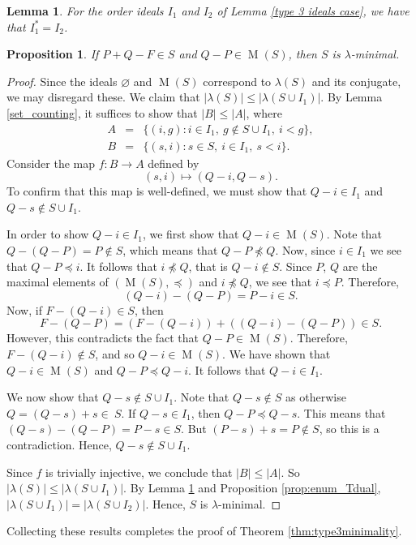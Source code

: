 \documentclass{amsproc}
\DeclareMathOperator{\M}{M}
\newtheorem{lemma}[theorem]{Lemma}
\newtheorem{prop}[theorem]{Proposition}
\theoremstyle{definition}
\theoremstyle{remark}
\numberwithin{equation}{section}
\begin{document}
\begin{lemma}\cite[Section 6]{chen2023enumeratingnumericalsetsassociated}
    \label{type 3 ideals duals}
    For the order ideals $I_1$ and $I_2$ of Lemma \ref{type 3 ideals case}, we have that $I_1^* = I_2$.
\end{lemma} 


\begin{prop}
    If $P+Q-F\in S$ and $Q-P \in \M(S)$, then $S$ is $\lambda$-minimal.
\end{prop}

\begin{proof}
    Since the ideals $\varnothing$ and $\M(S)$ correspond to $\lambda(S)$ and its conjugate, we may disregard these. We claim that $|\lambda(S)| \leq |\lambda(S\cup I_1)|$. By Lemma \ref{set_counting}, it suffices to show that $|B|\leq |A|$, where
    \begin{eqnarray*}    
    A & = & \{(i,g):i\in I_1,\ g\notin S\cup I_1,\ i<g\},\\
    B & = & \{(s,i):s\in S,\ i\in I_1,\ s<i\}.
    \end{eqnarray*}
    Consider the map $f: B\to A$ defined by
    $$(s, i)\mapsto(Q-i, Q-s).$$
    To confirm that this map is well-defined, we must show that $Q-i \in I_1$ and $Q-s \notin S\cup I_1$. 

    In order to show $Q-i\in I_1$, we first show that $Q-i\in \M(S)$.  Note that $Q-(Q-P)=P\notin S$, which means that $Q-P\not\preccurlyeq Q$. Now, since $i \in I_1$ we see that
    $Q-P\preccurlyeq i$. It follows that $i\not\preccurlyeq Q$, that is $Q-i\notin S$.
    Since $P$, $Q$ are the maximal elements of $(\M(S),\preccurlyeq)$ and $i\not\preccurlyeq Q$, we see that $i\preccurlyeq P$. Therefore,
    \[
    (Q-i)-(Q-P)=P-i\in S.
    \]
    Now, if $F-(Q-i)\in S$, then
    \[
    F-(Q-P)= \left(F-(Q-i)\right) + \left((Q-i)-(Q-P)\right) \in S.
    \]
    However, this contradicts the fact that $Q-P\in \M(S)$. Therefore, $F-(Q-i)\notin S$, and so $Q-i\in \M(S)$.
    We have shown that $Q-i\in\M(S)$ and $Q-P \preccurlyeq Q-i$. It follows that $Q-i\in I_1$.


    We now show that $Q-s \notin S\cup I_1$. Note that $Q-s \notin S$ as otherwise $Q=(Q-s)+s\in~S$. If $Q-s \in I_1$, then $Q-P \preccurlyeq Q-s$. This means that $(Q-s) - (Q-P) = P-s\in S$. But $(P-s)
    +s=P\notin S$, so this is a contradiction. Hence, $Q-s \notin S \cup I_1$.
    
    Since $f$ is trivially injective, we conclude that $|B| \leq |A|$. So $|\lambda(S)| \leq |\lambda(S\cup I_1)|$. By Lemma \ref{type 3 ideals duals} and Proposition \ref{prop:enum_Tdual}, $|\lambda(S\cup I_1)|= |\lambda(S\cup I_2)|$. Hence, $S$ is $\lambda$-minimal. 
\end{proof}
\noindent Collecting these results completes the proof of Theorem \ref{thm:type3minimality}.
\end{document}
